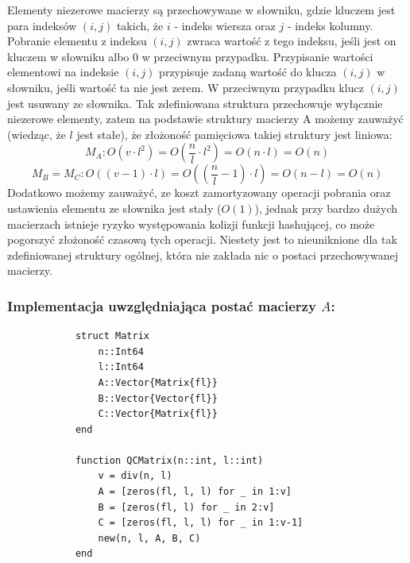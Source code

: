 \documentclass[11pt]{article}
\begin{document}
        \noindent
        Elementy niezerowe macierzy są przechowywane w słowniku, gdzie kluczem jest para indeksów $(i, j)$ takich, że $i$ - indeks wiersza oraz $j$ - indeks kolumny.
        \newline
        Pobranie elementu z indeksu $(i, j)$ zwraca wartość z tego indeksu, jeśli jest on kluczem w słowniku albo $0$ w przeciwnym przypadku.
        \newline
        Przypisanie wartości elementowi na indeksie $(i, j)$ przypisuje zadaną wartość do klucza $(i, j)$ w słowniku, jeśli wartość ta nie jest zerem. W przeciwnym przypadku klucz $(i, j)$ jest usuwany ze słownika.
        \newline\newline
        Tak zdefiniowana struktura przechowuje wyłącznie niezerowe elementy, zatem na podstawie struktury macierzy A możemy zauważyć (wiedząc, że $l$ jest stałe), że złożoność pamięciowa takiej struktury jest liniowa:
        $$ M_A : O(v \cdot l^2) = O(\frac{n}{l} \cdot l^2) = O(n \cdot l) = O(n) $$
        $$ M_B = M_C : O((v - 1) \cdot l) = O((\frac{n}{l} - 1) \cdot l) = O(n - l) = O(n) $$
        \noindent
        Dodatkowo możemy zauważyć, ze koszt zamortyzowany operacji pobrania oraz ustawienia elementu ze słownika jest stały ($O(1)$), jednak przy bardzo dużych macierzach istnieje ryzyko występowania kolizji funkcji hashującej, co może pogorszyć złożoność czasową tych operacji. Niestety jest to nieuniknione dla tak zdefiniowanej struktury ogólnej, która nie zakłada nic o postaci przechowywanej macierzy.
        \newline

    \subsubsection*{Implementacja uwzględniająca postać macierzy $A$:}
        \begin{lstlisting}
            struct Matrix
                n::Int64
                l::Int64
                A::Vector{Matrix{fl}}
                B::Vector{Vector{fl}}
                C::Vector{Matrix{fl}}
            end

            function QCMatrix(n::int, l::int)
                v = div(n, l)
                A = [zeros(fl, l, l) for _ in 1:v]
                B = [zeros(fl, l) for _ in 2:v]
                C = [zeros(fl, l, l) for _ in 1:v-1]
                new(n, l, A, B, C)
            end
        \end{lstlisting}
\end{document}
